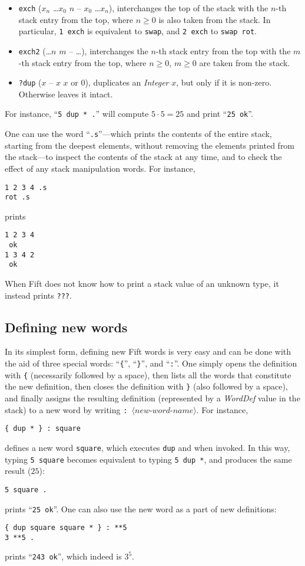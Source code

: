\documentclass[12pt,oneside]{article}
\def\mysubsection#1{\subsection{#1}\fancyhead[C]{\small{\textsc{\textrm{\thesubsection.} #1}}}}
\begin{document}
\begin{itemize}
\item {\tt exch} ($x_n$ \dots $x_0$ $n$ -- $x_0$ \dots $x_n$), interchanges the top of the stack with the $n$-th stack entry from the top, where $n\geq0$ is also taken from the stack. In particular, {\tt 1 exch} is equivalent to {\tt swap}, and {\tt 2 exch} to {\tt swap rot}.
\item {\tt exch2} (\dots $n$ $m$ -- \dots), interchanges the $n$-th stack entry from the top with the $m$-th stack entry from the top, where $n\geq0$, $m\geq0$ are taken from the stack.
\item {\tt ?dup} ($x$ -- $x$ $x$ or $0$), duplicates an {\em Integer\/} $x$, but only if it is non-zero. Otherwise leaves it intact.
\end{itemize}
For instance, ``{\tt 5 dup * .}'' will compute $5\cdot 5=25$ and print ``{\tt 25 ok}''.

One can use the word ``{\tt .s}''---which prints the contents of the entire stack, starting from the deepest elements, without removing the elements printed from the stack---to inspect the contents of the stack at any time, and to check the effect of any stack manipulation words. For instance,
\begin{verbatim}
1 2 3 4 .s
rot .s
\end{verbatim}
prints
\begin{verbatim}
1 2 3 4
 ok
1 3 4 2
 ok
\end{verbatim}

When Fift does not know how to print a stack value of an unknown type, it instead prints {\tt ???}.

\mysubsection{Defining new words}\label{p:colon.def}
In its simplest form, defining new Fift words is very easy and can be done with the aid of three special words: ``{\tt \{}'', ``{\tt \}}'', and ``{\tt :}''. One simply opens the definition with {\tt \{} (necessarily followed by a space), then lists all the words that constitute the new definition, then closes the definition with {\tt \}} (also followed by a space), and finally assigns the resulting definition (represented by a {\em WordDef\/} value in the stack) to a new word by writing {\tt:\ $\langle\textit{new-word-name}\rangle$}. For instance,
\begin{verbatim}
{ dup * } : square
\end{verbatim}
defines a new word {\tt square}, which executes {\tt dup} and {\tt *} when invoked. In this way, typing {\tt 5 square} becomes equivalent to typing {\tt 5 dup *}, and produces the same result ($25$):
\begin{verbatim}
5 square .
\end{verbatim}
prints ``{\tt 25 ok}''. One can also use the new word as a part of new definitions:
\begin{verbatim}
{ dup square square * } : **5
3 **5 .
\end{verbatim}
prints ``{\tt 243 ok}'', which indeed is $3^5$.
\end{document}
